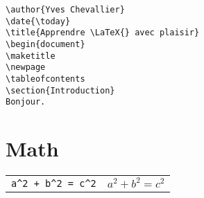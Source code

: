 \documentclass{article}
\begin{document}
\begin{multicols*}{3}
\begin{lstlisting}
\author{Yves Chevallier}
\date{\today}
\title{Apprendre \LaTeX{} avec plaisir}
\begin{document}
\maketitle
\newpage
\tableofcontents
\section{Introduction}
Bonjour.
\end{lstlisting}

\section*{Math}

\begin{tabularx}{\columnwidth}{Xl}
    \lstinline{a^2 + b^2 = c^2} & $a^2 + b^2 = c^2$ \\
\end{tabularx}

\begin{multicols*}{2}


\end{multicols*}
\end{multicols*}
\end{document}
